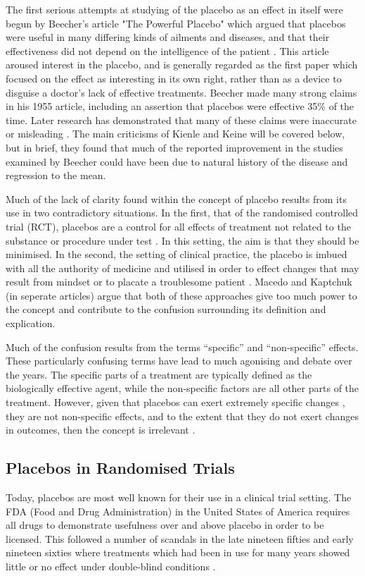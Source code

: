 The first serious attempts at studying of the placebo as an effect in itself  were begun by Beecher's article "The Powerful Placebo" which argued that placebos were useful in many differing kinds of ailments and diseases, and that their effectiveness did not depend on the intelligence of the patient \cite{beecher1955powerful,Kaptchuk1998}.  This article aroused interest in the placebo, and is generally regarded as the first paper which focused on the effect as interesting in its own right, rather than as a device to disguise a doctor's lack of effective treatments. Beecher made many strong claims in his 1955 article, including an assertion that placebos were effective 35\% of the time. Later research has demonstrated that many of these claims were  inaccurate or misleading \cite{Kienle1998}. The main criticisms of Kienle and Keine will be covered below, but in brief,  they found that much of the reported improvement in the studies examined by Beecher could have been due to natural history of the disease and regression to the mean.  

Much of the lack of clarity found within the concept of placebo \cite{Macedo2003,Kaptchuk1998} results from its use in two contradictory situations. In the first, that of the randomised controlled trial (RCT), placebos are a control for all effects of treatment not related to the substance or procedure under test \cite{Vickers2000}. In this setting, the aim is that they should be minimised. In the second, the setting of clinical practice, the placebo is imbued with all the authority of medicine and utilised in order to effect changes that may result from mindset or to placate a troublesome patient \cite{Bootzin2003,Sherman2008a}. Macedo and Kaptchuk (in seperate articles) argue that both of these approaches give too much power to the concept and contribute to the confusion surrounding its definition and explication. 

Much of the confusion results from the terms ``specific'' and ``non-specific'' effects. These particularly confusing terms have lead to much agonising and debate over the years. The specific parts of a treatment are typically defined as the biologically effective agent, while the non-specific factors are all other parts of the treatment. However, given that placebos can exert extremely specific changes \cite{Amanzio2001}, they are not non-specific effects, and to the extent that they do not exert changes in outcomes, then the concept is irrelevant \cite{Moerman2003}.  

\subsection{Placebos in Randomised Trials}
\label{sec:plac-rand-trials}
Today, placebos are most well known for their use in a clinical trial setting. The FDA (Food and Drug Administration) in the United States of America  requires all drugs to demonstrate usefulness over and above placebo in order to be licensed. This followed a number of scandals in the late nineteen fifties and early nineteen sixties where treatments which had been in use for many years showed little or no effect under double-blind conditions \cite{Moerman2000a}. 

